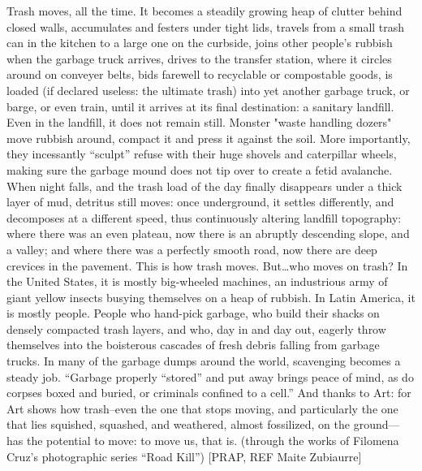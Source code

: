 \documentclass[12pt]{article}
\providecommand{\quotes}[1]{``#1''}
\begin{document}
Trash moves, all the time. It becomes a steadily growing heap of clutter behind closed walls, accumulates and festers under tight lids, travels from a small trash can in the kitchen to a large one on the curbside, joins other people’s rubbish when the garbage truck arrives, drives to the transfer station, where it circles around on conveyer belts, bids farewell to recyclable or compostable goods, is loaded (if declared useless: the ultimate trash) into yet another garbage truck, or barge, or even train, until it arrives at its final destination: a sanitary landfill. Even in the landfill, it does not remain still. Monster "waste handling dozers" move rubbish around, compact it and press it against the soil. More importantly, they incessantly “sculpt” refuse with their huge shovels and caterpillar wheels, making sure the garbage mound does not tip over to create a fetid avalanche. When night falls, and the trash load of the day finally disappears under a thick layer of mud, detritus still moves: once underground, it settles differently, and decomposes at a different speed, thus continuously altering landfill topography: where there was an even plateau, now there is an abruptly descending slope, and a valley; and where there was a perfectly smooth road, now there are deep crevices in the pavement. This is how trash moves. But\ldots who moves on trash? In the United States, it is mostly big-wheeled machines, an industrious army of giant yellow insects busying themselves on a heap of rubbish. In Latin America, it is mostly people. People who hand-pick garbage, who build their shacks on densely compacted trash layers, and who, day in and day out, eagerly throw themselves into the boisterous cascades of fresh debris falling from garbage trucks. In many of the garbage dumps around the world, scavenging becomes a steady job. \quotes{Garbage properly \quotes{stored} and put away brings peace of mind, as do corpses boxed and buried, or criminals confined to a cell.} And
thanks to Art: for Art shows how trash--even the one that stops moving, and particularly the one that lies squished, squashed, and weathered, almost fossilized, on the ground---has the potential to move: to move us, that is. (through the works of Filomena Cruz's photographic series “Road Kill”) [PRAP, REF Maite Zubiaurre]

%
\end{document}
